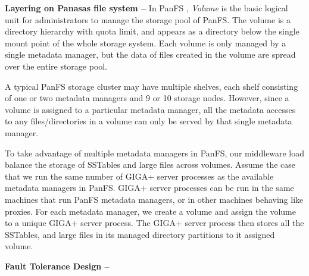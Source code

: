 \textbf{Layering on Panasas file system -- }
In PanFS \cite{PanFS}, \textit{Volume} is the basic logical unit
for administrators to manage the storage pool of PanFS.
The volume is a directory hierarchy with quota limit, and appears
as a directory below the single mount point of the whole storage system.
Each volume is only managed by a single metadata manager, but
the data of files created in the volume are spread over the entire storage pool.

A typical PanFS storage cluster may have multiple shelves,
each shelf consisting of one or two metadata managers and 9 or 10 storage nodes.
However, since a volume is assigned to a particular metadata manager,
all the metadata accesses to any files/directories in a volume
can only be served by that single metadata manager.

To take advantage of multiple metadata managers in PanFS,
our middleware load balance the storage of SSTables and large files across volumes.
Assume the case that we run the same number of GIGA+ server processes
as the available metadata managers in PanFS.
GIGA+ server processes can be run in the same machines that run PanFS metadata managers,
or in other machines behaving like proxies.
For each metadata manager, we create a volume and assign the volume
to a unique GIGA+ server process.
The GIGA+ server process then stores all the SSTables,
and large files in its managed directory partitions to it assigned volume.

\textbf{Fault Tolerance Design -- }

